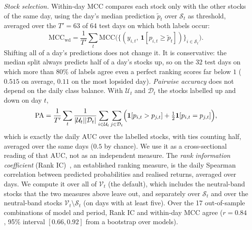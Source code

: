 \documentclass[conference]{IEEEtran}
\begin{document}
\emph{Stock selection.} Within-day MCC compares each stock only with the other
stocks of the same day, using the day's median prediction $\tilde p_t$ over
$\mathcal{S}_t$ as threshold, averaged over the $T'=63$ of 64 test days on which both
labels occur:
\begin{equation}
\mathrm{MCC}_{\mathrm{wd}}=\frac{1}{T'}\sum_{t}\mathrm{MCC}\bigl(\{(y_{i,t},\,\mathbf{1}[p_{i,t}\ge\tilde p_t])\}_{i\in\mathcal{S}_t}\bigr).
\end{equation}
Shifting all of a day's predictions does not change it. It is conservative: the median
split always predicts half of a day's stocks up, so on the 32 test days on which more
than $80\%$ of labels agree even a perfect ranking scores far below $1$ ($0.515$ on
average, $0.11$ on the most lopsided day). \emph{Pairwise accuracy} does not depend
on the daily class balance. With $\mathcal{U}_t$ and $\mathcal{D}_t$ the stocks
labelled up and down on day $t$,
\begin{equation}
\mathrm{PA}=\frac{1}{T'}\sum_{t}\frac{1}{|\mathcal{U}_t||\mathcal{D}_t|}\sum_{i\in\mathcal{U}_t}\sum_{j\in\mathcal{D}_t}\Bigl(\mathbf{1}[p_{i,t}>p_{j,t}]+\tfrac{1}{2}\mathbf{1}[p_{i,t}=p_{j,t}]\Bigr),
\end{equation}
which is exactly the daily AUC over the labelled stocks, with ties counting half,
averaged over the same days ($0.5$ by chance). We use it as a cross-sectional reading
of that AUC, not as an independent measure.
The \emph{rank information coefficient} (Rank IC)~\cite{grinold2000active}, an
established ranking measure, is the daily Spearman correlation between predicted
probabilities and realised returns, averaged over days. We compute it over all of
$\mathcal{V}_t$ (the default), which includes the neutral-band stocks that the two
measures above leave out, and separately over $\mathcal{S}_t$ and over the
neutral-band stocks $\mathcal{V}_t\setminus\mathcal{S}_t$ (on days with at least
five). Over the 17 out-of-sample combinations of model and period, Rank IC and
within-day MCC agree ($r=0.84$, 95\% interval $[0.66, 0.92]$ from a bootstrap over
models).
\end{document}
